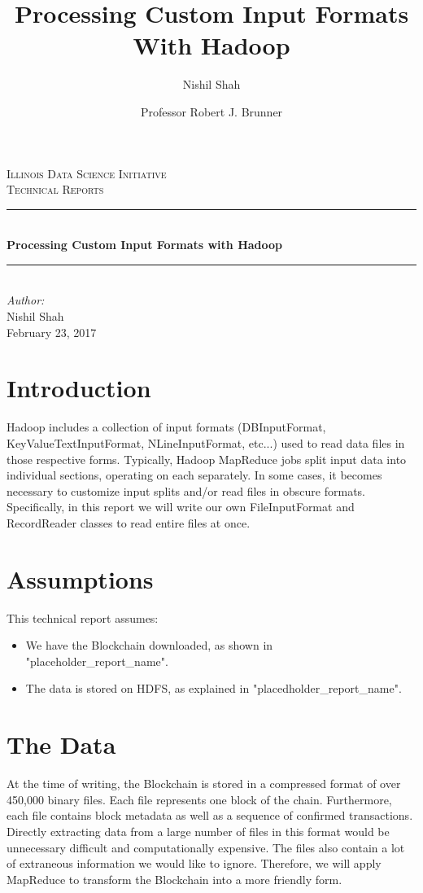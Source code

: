 \documentclass[9pt,twocolumn,twoside]{idsi}
\author[1,3]{Nishil Shah}
\author[2,3]{Professor Robert J. Brunner}
\affil[1]{National Center For Supercomputing Applications (NCSA)}
\affil[2]{Laboratory for Computation, Data, and Machine Learning}
\affil[3]{Illinois Data Science Initiative}
\title{Processing Custom Input Formats With Hadoop}
\newcommand{\HRule}{\rule{\linewidth}{0.5mm}}
\begin{document}
\begin{titlepage}
\center
\textsc{\LARGE Illinois Data Science Initiative}\\[1.5cm]
\textsc{\Large Technical Reports}\\[0.5cm] \HRule \\[0.4cm]
{\huge \bfseries Processing Custom Input Formats with Hadoop } \\[0.4cm] \HRule \\[1.5cm]
\Large \emph{Author:}\\ Nishil Shah \\[3cm]
{\large February 23, 2017}\\[3cm] %
\vfill
\end{titlepage}
%

\maketitle

\section{Introduction}
Hadoop includes a collection of input formats (DBInputFormat, KeyValueTextInputFormat, NLineInputFormat, etc...) used to read data files in those respective forms. Typically, Hadoop MapReduce jobs split input data into individual sections, operating on each separately. In some cases, it becomes necessary to customize input splits and/or read files in obscure formats. Specifically, in this report we will write our own FileInputFormat and RecordReader classes to read entire files at once.

\section{Assumptions}
This technical report assumes:
\begin{itemize}
    \item We have the Blockchain downloaded, as shown in "placeholder\_report\_name".
    \item The data is stored on HDFS, as explained in "placedholder\_report\_name".
\end{itemize}

\section{The Data}
At the time of writing, the Blockchain is stored in a compressed format of over 450,000 binary files. Each file represents one block of the chain. Furthermore, each file contains block metadata as well as a sequence of confirmed transactions. Directly extracting data from a large number of files in this format would be unnecessary difficult and computationally expensive. The files also contain a lot of extraneous information we would like to ignore. Therefore, we will apply MapReduce to transform the Blockchain into a more friendly form.
\end{document}
